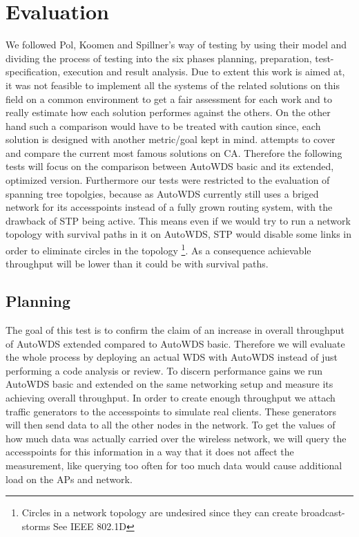 \chapter{Evaluation}
We followed Pol, Koomen and Spillner's way of testing \cite{pol2000management} by using their model and dividing the process of testing into the 
six phases planning, preparation, test-specification, execution and result analysis. Due to extent this work is aimed at, 
it was not feasible to implement all the systems of the related solutions on this field on a common environment
to get a fair assessment for each work and to really estimate how each solution performes against the others. 
On the other hand such a comparison would have to be treated with caution since, each solution is designed with another metric/goal kept in mind.
\cite{overview_caa} attempts to cover and compare the current most famous solutions on \ac{CA}. 
Therefore the following tests will focus on the comparison between AutoWDS basic and its extended, optimized version.
Furthermore our tests were restricted to the evaluation of spanning tree topolgies, because as AutoWDS currently 
still uses a briged network for its accesspoints instead of a fully grown routing system, with the drawback of \ac{STP} being active.
This means even if we would try to run a network topology with survival paths in it on AutoWDS, \ac{STP} would disable some links in order to 
eliminate circles in the topology \footnote{Circles in a network topology are undesired since they can create broadcast-storms See IEEE 802.1D}.
As a consequence achievable throughput will be lower than it could be with survival paths.

\newpage

  \section{Planning}
    The goal of this test is to confirm the claim of an increase in overall throughput of AutoWDS extended compared to AutoWDS basic.
    Therefore we will evaluate the whole process by deploying an actual WDS with AutoWDS instead of just performing a code analysis or review.
    To discern performance gains we run AutoWDS basic and extended on the same networking setup and measure its achieving overall throughput.
    In order to create enough throughput we attach traffic generators to the accesspoints to simulate real clients.
    These generators will then send data to all the other nodes in the network.
    To get the values of how much data was actually carried over the wireless network, we will query the accesspoints for this information in a way that it 
    does not affect the measurement, like querying too often for too much data would cause additional load on the APs and network.
    
